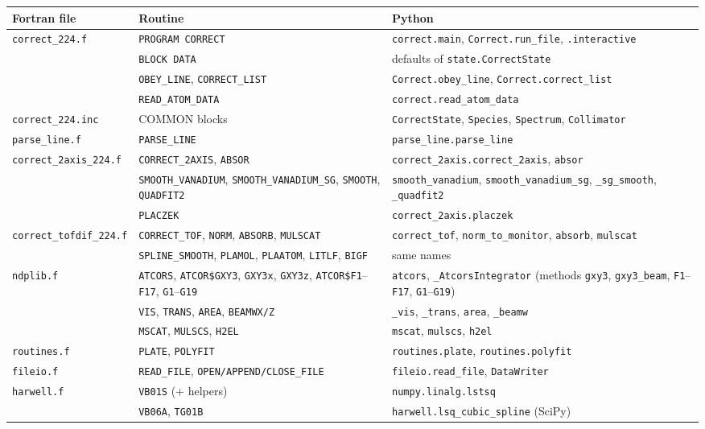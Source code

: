 \documentclass[11pt,a4paper]{report}
\newcommand{\code}[1]{\texttt{#1}}
\newcommand{\file}[1]{\texttt{#1}}
\begin{document}
\begin{longtable}{@{}>{\raggedright\arraybackslash}p{3.5cm} >{\raggedright\arraybackslash}p{5.5cm} >{\raggedright\arraybackslash}p{6.0cm}@{}}
\toprule
Fortran file & Routine & Python \\
\midrule
\endhead
\file{correct\_224.f} & \code{PROGRAM CORRECT} & \code{correct.main}, \code{Correct.run\_file}, \code{.interactive} \\
 & \code{BLOCK DATA} & defaults of \code{state.CorrectState} \\
 & \code{OBEY\_LINE}, \code{CORRECT\_LIST} & \code{Correct.obey\_line}, \code{Correct.correct\_list} \\
 & \code{READ\_ATOM\_DATA} & \code{correct.read\_atom\_data} \\
\file{correct\_224.inc} & COMMON blocks & \code{CorrectState}, \code{Species}, \code{Spectrum}, \code{Collimator} \\
\file{parse\_line.f} & \code{PARSE\_LINE} & \code{parse\_line.parse\_line} \\
\file{correct\_2axis\_\allowbreak 224.f} & \code{CORRECT\_2AXIS}, \code{ABSOR} & \code{correct\_2axis.\allowbreak correct\_2axis}, \code{absor} \\
 & \code{SMOOTH\_VANADIUM}, \code{SMOOTH\_VANADIUM\_SG}, \code{SMOOTH}, \code{QUADFIT2} & \code{smooth\_vanadium}, \code{smooth\_vanadium\_sg}, \code{\_sg\_smooth}, \code{\_quadfit2} \\
 & \code{PLACZEK} & \code{correct\_2axis.placzek} \\
\file{correct\_tofdif\_\allowbreak 224.f} & \code{CORRECT\_TOF}, \code{NORM}, \code{ABSORB}, \code{MULSCAT} & \code{correct\_tof}, \code{norm\_to\_monitor}, \code{absorb}, \code{mulscat} \\
 & \code{SPLINE\_SMOOTH}, \code{PLAMOL}, \code{PLAATOM}, \code{LITLF}, \code{BIGF} & same names \\
\file{ndplib.f} & \code{ATCORS}, \code{ATCOR\$GXY3}, \code{GXY3x}, \code{GXY3z}, \code{ATCOR\$F1}--\code{F17}, \code{G1}--\code{G19} & \code{atcors}, \code{\_AtcorsIntegrator} (methods \code{gxy3}, \code{gxy3\_beam}, \code{F1}--\code{F17}, \code{G1}--\code{G19}) \\
 & \code{VIS}, \code{TRANS}, \code{AREA}, \code{BEAMWX/Z} & \code{\_vis}, \code{\_trans}, \code{area}, \code{\_beamw} \\
 & \code{MSCAT}, \code{MULSCS}, \code{H2EL} & \code{mscat}, \code{mulscs}, \code{h2el} \\
\file{routines.f} & \code{PLATE}, \code{POLYFIT} & \code{routines.plate}, \code{routines.polyfit} \\
\file{fileio.f} & \code{READ\_FILE}, \code{OPEN/APPEND/CLOSE\_FILE} & \code{fileio.read\_file}, \code{DataWriter} \\
\file{harwell.f} & \code{VB01S} (+ helpers) & \code{numpy.linalg.lstsq} \\
 & \code{VB06A}, \code{TG01B} & \code{harwell.lsq\_cubic\_spline} (SciPy) \\
\bottomrule
\end{longtable}
\end{document}
